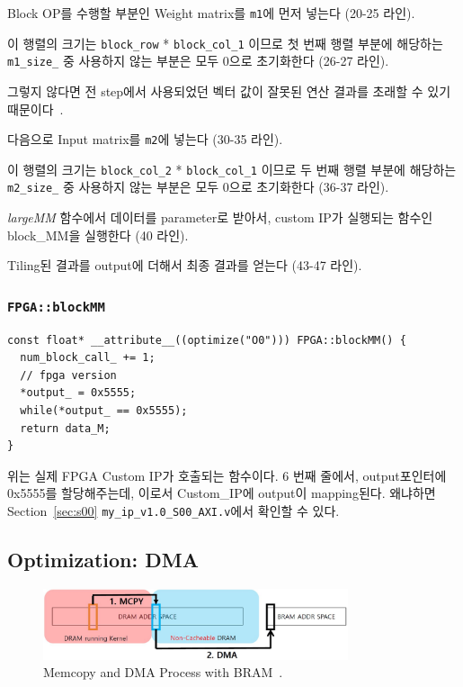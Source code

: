 \documentclass{article}
\begin{document}
\begin{itemize*}
\item Block OP를 수행할 부분인 Weight matrix를 \texttt{m1}에 먼저 넣는다 (20-25 라인).
\item 이 행렬의 크기는 \texttt{block\_row} * \texttt{block\_col\_1} 이므로 첫 번째 행렬 부분에 해당하는 \texttt{m1\_size\_} 중 사용하지 않는 부분은 모두 0으로 초기화한다 (26-27 라인).
\begin{itemize*}
\item 그렇지 않다면 전 step에서 사용되었던 벡터 값이 잘못된 연산 결과를 초래할 수 있기 때문이다~\cite{lab2}.
\end{itemize*}
\item 다음으로 Input matrix를 \texttt{m2}에 넣는다 (30-35 라인). 
\item 이 행렬의 크기는 \texttt{block\_col\_2} * \texttt{block\_col\_1} 이므로 두 번째 행렬 부분에 해당하는 \texttt{m2\_size\_} 중 사용하지 않는 부분은 모두 0으로 초기화한다 (36-37 라인).
\item \textit{largeMM} 함수에서 데이터를 parameter로 받아서, custom IP가 실행되는 함수인 block\_MM을 실행한다 (40 라인).
\item Tiling된 결과를 output에 더해서 최종 결과를 얻는다 (43-47 라인).
\end{itemize*}

\subsubsection*{\texttt{FPGA::blockMM}}
\begin{lstlisting}[style={c-style}]
const float* __attribute__((optimize("O0"))) FPGA::blockMM() {
  num_block_call_ += 1;
  // fpga version
  *output_ = 0x5555;
  while(*output_ == 0x5555);
  return data_M;    
}
\end{lstlisting}
위는 실제 FPGA Custom IP가 호출되는 함수이다. 6 번째 줄에서, output포인터에 0x5555를 할당해주는데, 이로서 Custom\_IP에 output이 mapping된다. 왜냐하면 Section~\ref{sec:s00} \texttt{my\_ip\_v1.0\_S00\_AXI.v}에서 확인할 수 있다.

\newpage
\subsection{Optimization: DMA}

\begin{figure}[htb!]
	\centering
	\includegraphics[width=0.8\textwidth]{fig/V1_DMA/overview.jpg}
\caption{Memcopy and DMA Process with BRAM~\cite{lab11}.}
\label{fig:lab11}
\end{figure}
\end{document}
